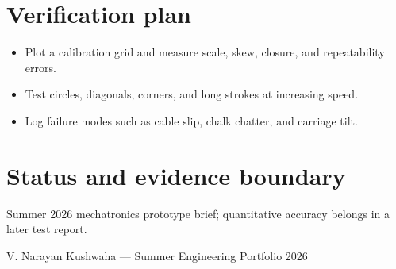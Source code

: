 \documentclass[10pt]{article}
\begin{document}
\section*{Verification plan}
\begin{itemize}
\item Plot a calibration grid and measure scale, skew, closure, and repeatability errors.
\item Test circles, diagonals, corners, and long strokes at increasing speed.
\item Log failure modes such as cable slip, chalk chatter, and carriage tilt.
\end{itemize}

\section*{Status and evidence boundary}
Summer 2026 mechatronics prototype brief; quantitative accuracy belongs in a later test report.

\vfill
\small\color{muted} V. Narayan Kushwaha --- Summer Engineering Portfolio 2026
\end{document}
